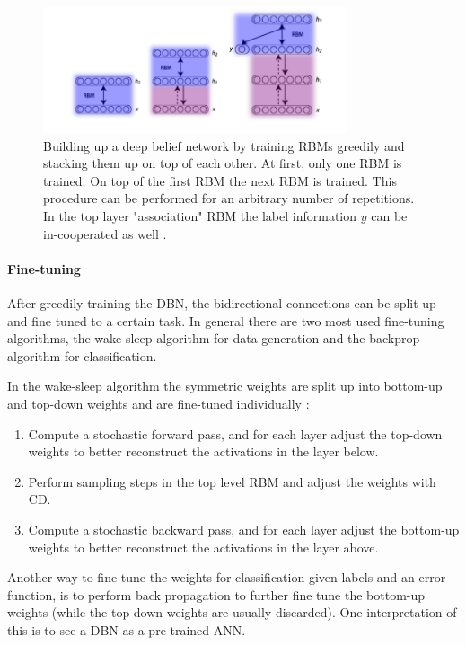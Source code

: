 \begin{figure}
	\centering
    	\includegraphics[width=0.8\textwidth]{imgs/dbn_stacking.png} 
    \caption[Building up a deep belief network.]{Building up a deep belief network by training RBMs greedily and stacking them up on top of each other. At first, only one RBM is trained. On top of the first RBM the next RBM is trained. This procedure can be performed for an arbitrary number of repetitions. In the top layer "association" RBM the label information $y$ can be in-cooperated as well \cite{DBNImg}.}
	\label{fig:dbn}
\end{figure}

\paragraph{Fine-tuning} \label{c:dbnfinetuning}

After greedily training the DBN, the bidirectional connections can be split up and fine tuned to a certain task.
In general there are two most used fine-tuning algorithms, the wake-sleep algorithm for data generation and the backprop algorithm for classification. 

In the wake-sleep algorithm the symmetric weights are split up into bottom-up and top-down weights and are fine-tuned individually \cite{hinton1995wake}:
\begin{enumerate}
\item Compute a stochastic forward pass, and for each layer adjust the top-down weights to better reconstruct the activations in the layer below.
\item Perform sampling steps in the top level RBM and adjust the weights with CD.
\item Compute a stochastic backward pass, and for each layer adjust the bottom-up weights to better reconstruct the activations in the layer above.
\end{enumerate}

Another way to fine-tune the weights for classification given labels and an error function, is to perform back propagation to further fine tune the bottom-up weights (while the top-down weights are usually discarded). 
One interpretation of this is to see a DBN as a pre-trained ANN.


